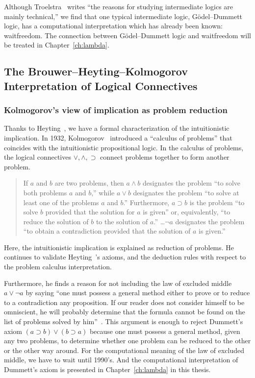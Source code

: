 Although Troelstra~\cite[p.~223]{goedelcollected} writes ``the reasons
for studying intermediate logics are mainly technical,'' we find that
one typical intermediate logic, G\"odel--Dummett logic, has a
computational interpretation which has already been known: waitfreedom.
The connection between G\"odel--Dummett logic and waitfreedom will be
treated in Chapter~\ref{ch:lambda}.

\subsection{The Brouwer--Heyting--Kolmogorov Interpretation of Logical Connectives}

\subsubsection{Kolmogorov's view of implication as problem reduction}

Thanks to Heyting~\cite{heyting1930}, we have a formal
characterization of the intuitionistic implication.
In 1932, Kolmogorov~\cite{kolmogorov1932} introduced a ``calculus of problems''
that coincides with the intuitionistic propositional logic.
In the calculus of problems, the logical connectives $\vee, \wedge,
\supset$ connect problems together to form another problem.
 \begin{quote}
  If $a$ and $b$ are two problems, then $a\land b$ designates the
  problem ``to solve both problems $a$ and $b$,'' while $a\lor b$
  designates the problem ``to solve at least one of the problems $a$ and
  $b$.''  Furthermore, $a\supset b$ is the problem ``to solve $b$
  provided that the solution for $a$ is given'' or, equivalently, ``to
  reduce the solution of $b$ to the solution of
  $a$.''  \ldots $\neg a$ designates the problem ``to obtain a
  contradiction provided that the solution of $a$ is
  given.''~\cite[p.~329]{kolmogorov1932}
 \end{quote}
 Here, the intuitionistic implication
 is explained as reduction of problems.
 He continues to validate Heyting~\cite{heyting1930}'s axioms, and the
 deduction rules with respect to the problem calculus interpretation.

 Furthermore, he finds a reason for not including the law of excluded
 middle $a\lor \neg a$ by saying ``one must possess a general method
 either to prove or to reduce to a contradiction any proposition.  If
 our reader does not consider himself to be omniscient, he will probably
 determine that the formula cannot be found on the list of problems
 solved by him''~\cite{kolmogorov1932}.
 This argument is enough to reject Dummett's axiom $(a\supset b)\lor
 (b\supset a)$ because one must possess a general method, given any two
 problems, to
 determine whether
 one problem can be reduced to the other or the other way around.
 For the computational meaning of the law of excluded middle, we have to
 wait until 1990's.
 And the computational interpretation of Dummett's axiom is
 presented in Chapter~\ref{ch:lambda} in this thesis.

